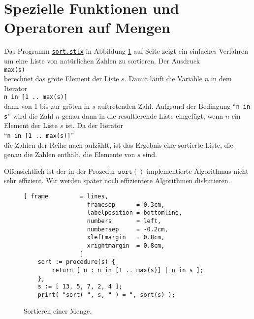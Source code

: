 \section{Spezielle Funktionen und Operatoren auf Mengen}
Das Programm 
\href{https://github.com/karlstroetmann/Logik/blob/master/SetlX/sort.stlx}{\texttt{sort.stlx}}
in Abbildung \ref{fig:sort.stlx} auf Seite
\pageref{fig:sort.stlx} zeigt ein einfaches Verfahren
 um eine Liste von nat\"{u}rlichen Zahlen zu sortieren.  
Der Ausdruck \\[0.2cm]
\hspace*{1.3cm}
\texttt{max(s)}
\\[0.2cm]
berechnet das gr\"{o}\3te Element der Liste $s$.  
Damit l\"{a}uft die Variable $n$ in dem Iterator
\\[0.2cm]
\hspace*{1.3cm}
\texttt{n in [1 .. max(s)]}
\\[0.2cm]
dann von 1 bis zur gr\"{o}\3ten in $s$ auftretenden Zahl.  
Aufgrund der Bedingung ``\texttt{n in s}''
wird die Zahl $n$ genau dann in die resultierende Liste eingef\"{u}gt, wenn $n$ ein
Element der Liste $s$ ist.  Da der Iterator 
\\[0.2cm]
\hspace*{1.3cm}
``\texttt{n in [1 .. max(s)]}'' 
\\[0.2cm]
die Zahlen der Reihe nach aufz\"{a}hlt, ist das
Ergebnis eine sortierte Liste, die genau die Zahlen enth\"{a}lt, die Elemente von $s$
sind.

Offensichtlich ist der in der Prozedur $\texttt{sort}()$ implementierte Algorithmus nicht sehr effizient.
Wir werden sp\"{a}ter noch effizientere Algorithmen diskutieren.

\begin{figure}[!ht]
  \centering
\begin{Verbatim}[ frame         = lines, 
                  framesep      = 0.3cm, 
                  labelposition = bottomline,
                  numbers       = left,
                  numbersep     = -0.2cm,
                  xleftmargin   = 0.8cm,
                  xrightmargin  = 0.8cm,
                ]
    sort := procedure(s) {
        return [ n : n in [1 .. max(s)] | n in s ];
    };
    s := [ 13, 5, 7, 2, 4 ];
    print( "sort( ", s, " ) = ", sort(s) );
\end{Verbatim} 
\vspace*{-0.3cm}
\caption{Sortieren einer Menge.}  \label{fig:sort.stlx}
\end{figure} %

